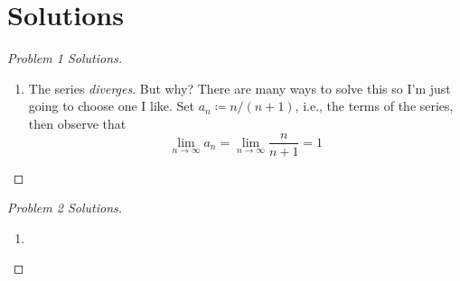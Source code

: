 \section*{Solutions}
\begin{proof}[Problem 1 Solutions]
\begin{enumerate}[label=1 (\alph*)]
\item The series \emph{diverges}. But why? There are many ways to solve
  this so I'm just going to choose one I like. Set $a_n\coloneqq n/(n+1)$,
  i.e., the terms of the series, then observe that
  \[
    \lim_{n\to\infty} a_n=\lim_{n\to\infty}\frac{n}{n+1}=1
  \]
\end{enumerate}
\end{proof}

\begin{proof}[Problem 2 Solutions]
\begin{enumerate}[label=2 (\alph*)]
\item
\end{enumerate}
\end{proof}
